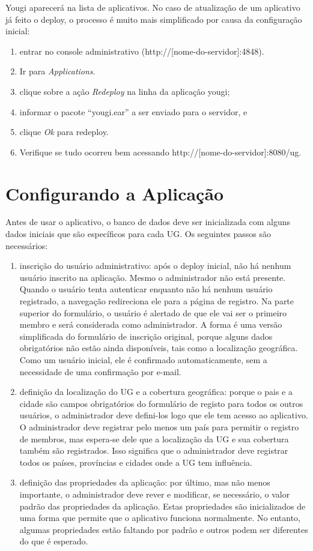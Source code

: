 \documentclass[envcountsame,envcountchap]{svmono}
\begin{document}
Yougi aparecerá na lista de aplicativos. No caso de atualização de um aplicativo já feito o deploy, o processo é muito mais simplificado por causa da configuração inicial:

\begin{enumerate}
\item entrar no console administrativo (http://[nome-do-servidor]:4848).
\item Ir para \textit{Applications}.
\item clique sobre a ação \textit{Redeploy} na linha da aplicação yougi;
\item informar o pacote “yougi.ear” a ser enviado para o servidor, e
\item clique \textit{Ok} para redeploy.
\item Verifique se tudo ocorreu bem acessando http://[nome-do-servidor]:8080/ug.
\end{enumerate}

\section{Configurando a Aplicação}

Antes de usar o aplicativo, o banco de dados deve ser inicializada com alguns dados iniciais que são específicos para cada UG. Os seguintes passos são necessários:

\begin{enumerate}
\item inscrição do usuário administrativo: após o deploy inicial, não há nenhum usuário inscrito na aplicação. Mesmo o administrador não está presente. Quando o usuário tenta autenticar enquanto não há nenhum usuário registrado, a navegação redireciona ele para a página de registro. Na parte superior do formulário, o usuário é alertado de que ele vai ser o primeiro membro e será considerada como administrador. A forma é uma versão simplificada do formulário de inscrição original, porque alguns dados obrigatórios não estão ainda disponíveis, tais como a localização geográfica. Como um usuário inicial, ele é confirmado automaticamente, sem a necessidade de uma confirmação por e-mail.
\item definição da localização do UG e a cobertura geográfica: porque o pais e a cidade são campos obrigatórios do formulário de registo para todos os outros usuários, o administrador deve defini-los logo que ele tem acesso ao aplicativo. O administrador deve registrar pelo menos um país para permitir o registro de membros, mas espera-se dele que a localização da UG e sua cobertura também são registrados. Isso significa que o administrador deve registrar todos os países, províncias e cidades onde a UG tem influência.
\item definição das propriedades da aplicação: por último, mas não menos importante, o administrador deve rever e modificar, se necessário, o valor padrão das propriedades da aplicação. Estas propriedades são inicializados de uma forma que permite que o aplicativo funciona normalmente. No entanto, algumas propriedades estão faltando por padrão e outros podem ser diferentes do que é esperado.
\end{enumerate}
\end{document}

